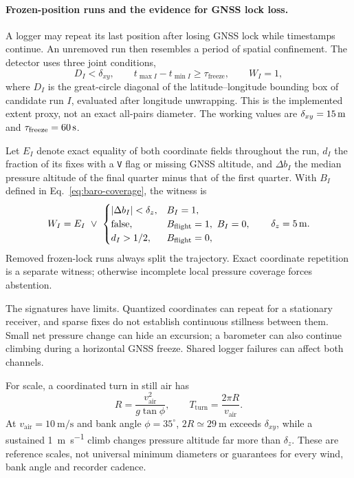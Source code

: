 \begin{revblock}
\paragraph{Frozen-position runs and the evidence for GNSS lock loss.}
A logger may repeat its last position after losing GNSS lock while timestamps continue.
An unremoved run then resembles a period of spatial confinement. The detector uses
three joint conditions,
\begin{equation}
 \label{eq:frozenlock}
 D_I<\delta_{xy},\qquad t_{\max I}-t_{\min I}\ge\tau_{\mathrm{freeze}},\qquad W_I=1,
\end{equation}
where $D_I$ is the great-circle diagonal of the latitude--longitude bounding box of
candidate run $I$, evaluated after longitude unwrapping. This is the implemented
extent proxy, not an exact all-pairs diameter. The working values are
$\delta_{xy}=\SI{15}{\metre}$ and
$\tau_{\mathrm{freeze}}=\SI{60}{\second}$.

Let $E_I$ denote exact equality of both coordinate fields throughout the run,
$d_I$ the fraction of its fixes with a \texttt{V} flag or missing GNSS altitude, and
$\Delta b_I$ the median pressure altitude of the final quarter minus that of the first
quarter. With $B_I$ defined in Eq.~\eqref{eq:baro-coverage}, the witness is
\begin{equation}
 W_I=E_I\ \lor\
 \begin{cases}
  |\Delta b_I|<\delta_z, & B_I=1,\\
  \mathrm{false}, & B_{\mathrm{flight}}=1,\ B_I=0,\\
  d_I>1/2, & B_{\mathrm{flight}}=0,
 \end{cases}
 \qquad \delta_z=\SI{5}{\metre}.
 \label{eq:frozen-witness}
\end{equation}
Removed frozen-lock runs always split the trajectory. Exact coordinate repetition
is a separate witness; otherwise incomplete local pressure coverage forces abstention.

The signatures have limits. Quantized coordinates can repeat for a stationary receiver,
and sparse fixes do not establish continuous stillness between them. Small net pressure
change can hide an excursion; a barometer can also continue climbing during a horizontal
GNSS freeze. Shared logger failures can affect both channels.

For scale, a coordinated turn in still air has
\begin{equation}
 R=\frac{v_{\mathrm{air}}^2}{g\tan\phi},\qquad
 T_{\mathrm{turn}}=\frac{2\pi R}{v_{\mathrm{air}}}.
 \label{eq:turn-radius-cleaning}
\end{equation}
At $v_{\mathrm{air}}=\SI{10}{\metre\per\second}$ and bank angle $\phi=35^\circ$,
$2R\simeq\SI{29}{\metre}$ exceeds $\delta_{xy}$, while a sustained
\SI{1}{\metre\per\second} climb changes pressure altitude far more than $\delta_z$.
These are reference scales, not universal minimum diameters or guarantees for every
wind, bank angle and recorder cadence.


\end{revblock}
